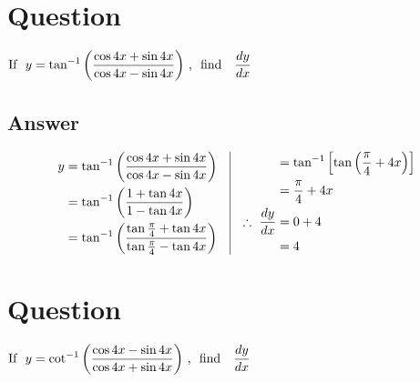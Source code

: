 \documentclass[17pt]{extarticle}
\begin{document}
\noindent
\begin{fleqn} 


\section{Question} 

$\begin{aligned}[t] 
\text{If \ } y =  \tan^{-1}\left(\frac{\cos 4x + \sin 4x}{\cos 4x - \sin 4x}\right) \text{\,, \  find \ \  } \frac{dy}{dx}
\end{aligned}$

\subsection*{Answer}
\begin{equation} \nonumber
\begin{alignedat}{4}
y &= \tan^{-1}\left(\frac{\cos 4x + \sin 4x}{\cos 4x - \sin 4x}\right)\\
  &= \tan^{-1}\left(\frac{1 + \tan 4x}{1 - \tan 4x}\right)\\
  &= \tan^{-1}\left(\frac{\tan \frac{\pi}{4} + \tan 4x}{\tan \frac{\pi}{4} - \tan 4x}\right)\\
\end{alignedat}
\quad
\vrule
\quad 
\begin{alignedat}{4}
&=  \tan^{-1}\left[ \tan \left( \frac{\pi}{4}+4x \right)\right]\\
&=  \frac{\pi}{4}+4x\\
\therefore \  \frac{dy}{dx} &= 0 + 4\\
&=4 \\
\end{alignedat}
\end{equation}
\section{Question} 

$\begin{aligned}[t] 
\text{If \ } y =  \cot^{-1}\left(\frac{\cos 4x - \sin 4x}{\cos 4x + \sin 4x}\right) \text{\,, \  find \ \  } \frac{dy}{dx}
\end{aligned}$

\end{fleqn}
\end{document}
